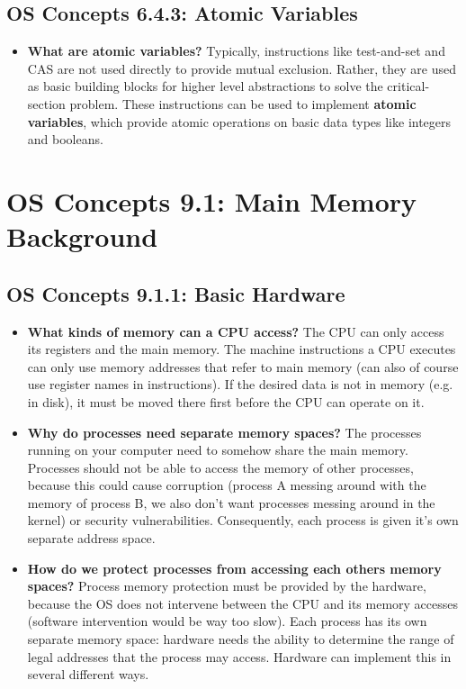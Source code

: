 \documentclass[12pt]{article}
\begin{document}
\subsection*{OS Concepts 6.4.3: Atomic Variables}

\begin{itemize}
    \item \textbf{What are atomic variables?} Typically, instructions like test-and-set and CAS are not used directly to provide mutual exclusion. Rather, they are used as basic building blocks for higher level abstractions to solve the critical-section problem. These instructions can be used to implement \textbf{atomic variables}, which provide atomic operations on basic data types like integers and booleans.
\end{itemize}

\section*{OS Concepts 9.1: Main Memory Background}

\subsection*{OS Concepts 9.1.1: Basic Hardware}

\begin{itemize}
    \item \textbf{What kinds of memory can a CPU access?} The CPU can only access its registers and the main memory. The machine instructions a CPU executes can only use memory addresses that refer to main memory (can also of course use register names in instructions). If the desired data is not in memory (e.g. in disk), it must be moved there first before the CPU can operate on it.
    \item \textbf{Why do processes need separate memory spaces?} The processes running on your computer need to somehow share the main memory. Processes should not be able to access the memory of other processes, because this could cause corruption (process A messing around with the memory of process B, we also don't want processes messing around in the kernel) or security vulnerabilities. Consequently, each process is given it's own separate address space.
    \item \textbf{How do we protect processes from accessing each others memory spaces?} Process memory protection must be provided by the hardware, because the OS does not intervene between the CPU and its memory accesses (software intervention would be way too slow). Each process has its own separate memory space: hardware needs the ability to determine the range of legal addresses that the process may access. Hardware can implement this in several different ways.
\end{itemize}
\end{document}
